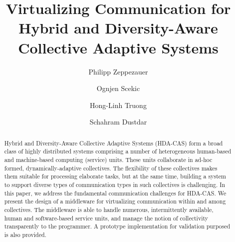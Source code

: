 \documentclass{llncs}
\begin{document}
%
\pagestyle{headings}  %

%
\title{Virtualizing Communication for Hybrid and Diversity-Aware Collective Adaptive Systems}
\author{Philipp Zeppezauer \and Ognjen Scekic \and Hong-Linh Truong \and Schahram Dustdar}




\maketitle


\begin{abstract}

Hybrid and Diversity-Aware Collective Adaptive Systems (HDA-CAS) form a 
broad class of highly distributed systems comprising a number of
heterogeneous human-based and machine-based computing (service) units.
These units %
collaborate in ad-hoc formed, dynamically-adaptive collectives.  
The flexibility of these collectives makes them suitable for processing elaborate tasks, but at the same time, building a system to support diverse types of communication types in such collectives is challenging. In this paper, we address the fundamental communication challenges for HDA-CAS. 
We present the design of a middleware for virtualizing communication  within and among collectives.
The middleware is able to handle numerous, intermittently available, human and software-based service units, and manage the notion of collectivity transparently to the programmer. A prototype implementation for validation purposed is also provided.
\end{abstract}
\end{document}
